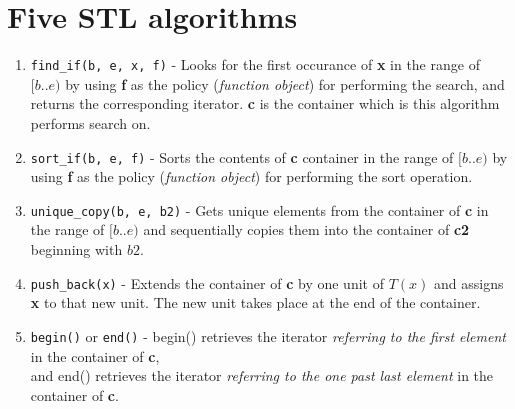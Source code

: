 \documentclass{article}
\begin{document}
 \section*{Five STL algorithms}
 \begin{enumerate}
  \item \texttt{find\_if(b, e, x, f)} \-- Looks for the first occurance of \textbf{x} in the range of $[b..e)$ 
  by using \textbf{f} as the policy (\textsl{function object}) for performing the search, and returns the 
  corresponding iterator. \textbf{c} is the container which is this algorithm performs search on.
  \item \texttt{sort\_if(b, e, f)} \-- Sorts the contents of \textbf{c} container in the range of $[b..e)$ by using 
  \textbf{f} as the policy (\textsl{function object}) for performing the sort operation.
  \item \texttt{unique\_copy(b, e, b2)} \-- Gets unique elements from the container of \textbf{c} in the range of $[b..e)$ 
  and sequentially copies them into the container of \textbf{c2} beginning with $b2$.
  \item \texttt{push\_back(x)} \-- Extends the container of \textbf{c} by one unit of $T(x)$ and assigns \textbf{x} to that new unit.
  The new unit takes place at the end of the container.
  \item \texttt{begin()} or \texttt{end()} \-- begin() retrieves the iterator \textsl{referring to the first element} in the container of \textbf{c},
  \\
  and end() retrieves the iterator \textsl{referring to the one past last element} in the container of \textbf{c}.
 \end{enumerate}
\end{document}
